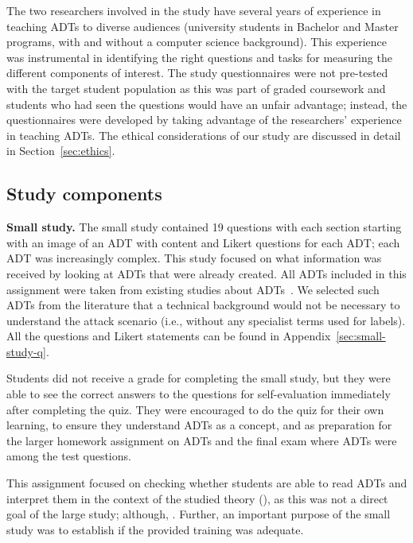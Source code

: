 The two researchers involved in the study have several years of experience in teaching ADTs to diverse audiences (university students in Bachelor and Master programs, with and without a computer science background). This experience was instrumental in identifying the right questions and tasks for measuring the different components of interest. The study questionnaires were not pre-tested with the target student population as this was part of graded coursework and students who had seen the questions would have an unfair advantage; instead, the questionnaires were developed by taking advantage of the researchers' experience in teaching ADTs. The ethical considerations of our study are discussed in detail in Section~\ref{sec:ethics}.






\subsection{Study components}\label{sec:studycomponents}

\textbf{Small study.}
The small study contained 19 questions with each section starting with an image of an ADT with content and Likert questions for each ADT; each ADT was increasingly complex. This study focused on what information was received by looking at ADTs that were already created. All ADTs included in this assignment were taken from existing studies about ADTs~\cite{buldasAttributeEvaluationAttack2020,mauwRFIDCommunicationBlock,sunCyberAttackRisksAnalysis2018,kordyAttackdefenseTrees2014}. We selected such ADTs from the literature that a technical background would not be necessary to understand the attack scenario (i.e., without any specialist terms used for labels). All the questions and Likert statements can be found in Appendix~\ref{sec:small-study-q}.


Students did not receive a grade for completing the small study, but they were able to see the correct answers to the questions for self-evaluation immediately after completing the quiz. They were encouraged to do the quiz for their own learning, to ensure they understand ADTs as a concept, and as preparation for the larger homework assignment on ADTs and the final exam where ADTs were among the test questions.

This assignment focused on checking whether students are able to read ADTs and interpret them in the context of the studied theory (), as this was not a direct goal of the large study; although, . Further, an important purpose of the small study was to establish if the provided training was adequate. 


